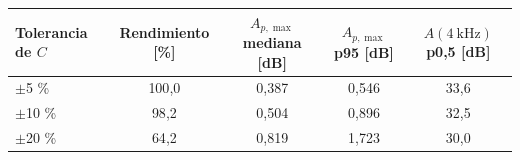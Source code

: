\begin{tabular}{@{}lcccc@{}}
\toprule
Tolerancia de $C$ & Rendimiento [\%] & $A_{p,\max}$ mediana [dB] & $A_{p,\max}$ p95 [dB] & $A(\qty{4}{\kilo\hertz})$ p0,5 [dB] \\
\midrule
$\pm$5 \% & 100{,}0 & 0{,}387 & 0{,}546 & 33{,}6 \\
$\pm$10 \% & 98{,}2 & 0{,}504 & 0{,}896 & 32{,}5 \\
$\pm$20 \% & 64{,}2 & 0{,}819 & 1{,}723 & 30{,}0 \\
\bottomrule
\end{tabular}